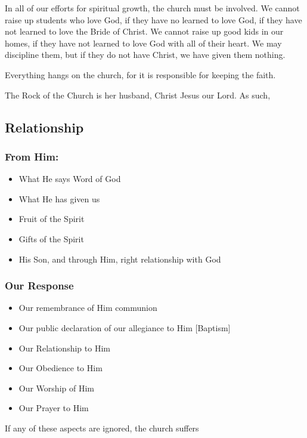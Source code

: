 In all of our efforts for spiritual growth, the church must be involved. We cannot raise up students who love God, if they have no learned to love God, if they have not learned to love the Bride of Christ. We cannot raise up good kids in our homes, if they have not learned to love God with all of their heart. We may discipline them, but if they do not have Christ, we have given them nothing.


Everything hangs on the church, for it is responsible for keeping the faith.


The Rock of the Church is her husband, Christ Jesus our Lord. As such,

\subsection{Relationship}

\subsubsection{From Him:}

\begin{itemize}
\item What He says Word of God
\item What He has given us
\item Fruit of the Spirit
\item Gifts of the Spirit
\item His Son, and through Him, right relationship with God
\end{itemize}

\subsubsection{Our Response}



\begin{itemize}
\item Our remembrance of Him communion
\item Our public declaration of our allegiance to Him [Baptism]
\item Our Relationship to Him
\item Our Obedience to Him
\item Our Worship of Him
\item Our Prayer to Him
\end{itemize}

If any of these aspects are ignored, the church suffers



